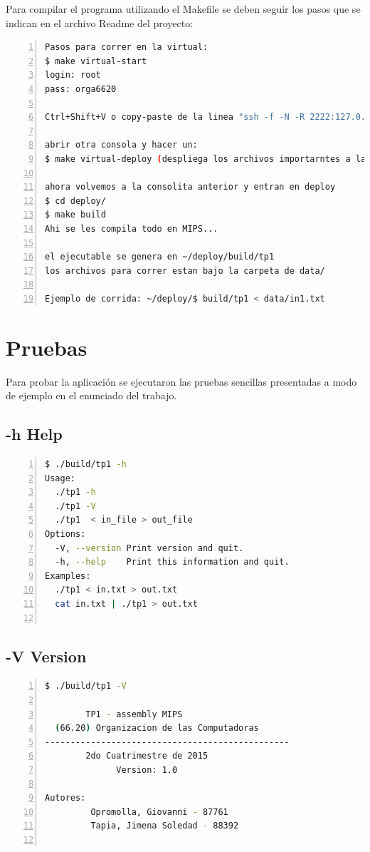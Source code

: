 \documentclass[a4paper,10pt]{article}
\begin{document}
Para compilar el programa utilizando el Makefile se deben seguir los pasos que se indican en el archivo Readme del proyecto: \\
\begin{lstlisting}[numbers=left,language=bash]
Pasos para correr en la virtual:
$ make virtual-start
login: root
pass: orga6620

Ctrl+Shift+V o copy-paste de la linea "ssh -f -N -R 2222:127.0.0.1:22 giovanni@172.20.0.1"

abrir otra consola y hacer un:
$ make virtual-deploy (despliega los archivos importarntes a la virtual)

ahora volvemos a la consolita anterior y entran en deploy
$ cd deploy/
$ make build
Ahi se les compila todo en MIPS... 

el ejecutable se genera en ~/deploy/build/tp1
los archivos para correr estan bajo la carpeta de data/

Ejemplo de corrida: ~/deploy/$ build/tp1 < data/in1.txt
\end{lstlisting}
\newpage

\section{Pruebas}

Para probar la aplicaci\'on se ejecutaron las pruebas sencillas presentadas a modo de ejemplo en el enunciado del trabajo. \\

\subsection{-h Help}

\begin{lstlisting}[numbers=left,language=bash]
  $ ./build/tp1 -h            
Usage:
  ./tp1 -h
  ./tp1 -V
  ./tp1  < in_file > out_file
Options:
  -V, --version Print version and quit.
  -h, --help    Print this information and quit.
Examples:
  ./tp1 < in.txt > out.txt
  cat in.txt | ./tp1 > out.txt


\end{lstlisting}



\subsection{-V Version}


\begin{lstlisting}[numbers=left,language=bash]
	$ ./build/tp1 -V

        TP1 - assembly MIPS
  (66.20) Organizacion de las Computadoras
------------------------------------------------
        2do Cuatrimestre de 2015
              Version: 1.0

Autores:
         Opromolla, Giovanni - 87761
         Tapia, Jimena Soledad - 88392


\end{lstlisting}
\end{document}
